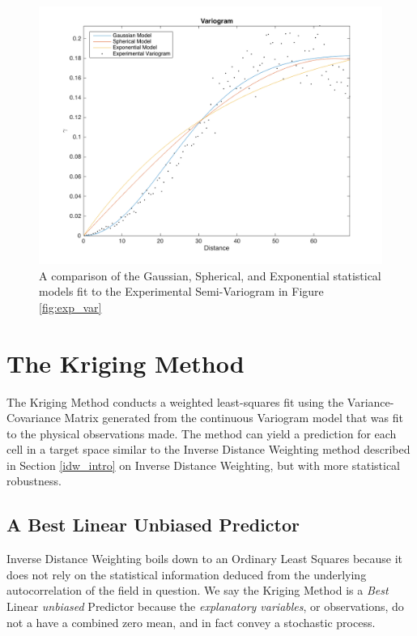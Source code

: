 \documentclass[11pt]{ucthesis}
\begin{document}
\begin{figure}[ht!]
    \centering    
	\includegraphics[width=\linewidth]{figures/fit_kern_comp.png}
	\captionsetup{skip=0.5\baselineskip,size=footnotesize}
	\caption{A comparison of the Gaussian, Spherical, and Exponential statistical models fit to the Experimental Semi-Variogram in Figure \ref{fig:exp_var}}
	\label{fig:kern_fit}
\end{figure}

\section{The Kriging Method}
The Kriging Method conducts a weighted least-squares fit using the Variance-Covariance Matrix generated from the continuous Variogram model that was fit to the physical observations made. The method can yield a prediction for each cell in a target space similar to the Inverse Distance Weighting method described in Section \ref{idw_intro} on Inverse Distance Weighting, but with more statistical robustness.

\subsection{A Best Linear Unbiased Predictor}
Inverse Distance Weighting boils down to an Ordinary Least Squares because it does not rely on the statistical information deduced from the underlying autocorrelation of the field in question. We say the Kriging Method is a \textit{Best} Linear \textit{unbiased} Predictor because the \textit{explanatory variables}, or observations, do not a have a combined zero mean, and in fact convey a stochastic process.
\end{document}
